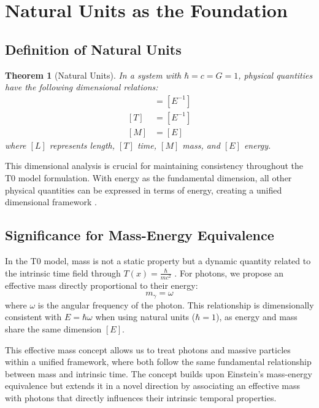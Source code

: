 \documentclass[12pt,a4paper]{article}
\newcommand{\Tfield}{T(x)}
\newtheorem{theorem}{Theorem}[section]
\begin{document}
	\section{Natural Units as the Foundation}
	\subsection{Definition of Natural Units}
	\begin{theorem}[Natural Units]
		In a system with \(\hbar = c = G = 1\), physical quantities have the following dimensional relations:
		\begin{align}
			[L] &= [E^{-1}] \\
			[T] &= [E^{-1}] \\
			[M] &= [E]
		\end{align}
		where \([L]\) represents length, \([T]\) time, \([M]\) mass, and \([E]\) energy.
	\end{theorem}
	
	This dimensional analysis is crucial for maintaining consistency throughout the T0 model formulation. With energy as the fundamental dimension, all other physical quantities can be expressed in terms of energy, creating a unified dimensional framework \cite{pascher_alpha_2025}.
	
	\subsection{Significance for Mass-Energy Equivalence}
	In the T0 model, mass is not a static property but a dynamic quantity related to the intrinsic time field through \(\Tfield = \frac{\hbar}{m c^2}\) \cite{pascher_lagrange_2025}. For photons, we propose an effective mass directly proportional to their energy:
	\begin{equation}
		m_\gamma = \omega
	\end{equation}
	where \(\omega\) is the angular frequency of the photon. This relationship is dimensionally consistent with \(E = \hbar \omega\) when using natural units (\(\hbar = 1\)), as energy and mass share the same dimension \([E]\).
	
	This effective mass concept allows us to treat photons and massive particles within a unified framework, where both follow the same fundamental relationship between mass and intrinsic time. The concept builds upon Einstein's mass-energy equivalence \cite{einstein} but extends it in a novel direction by associating an effective mass with photons that directly influences their intrinsic temporal properties.
	
\end{document}

